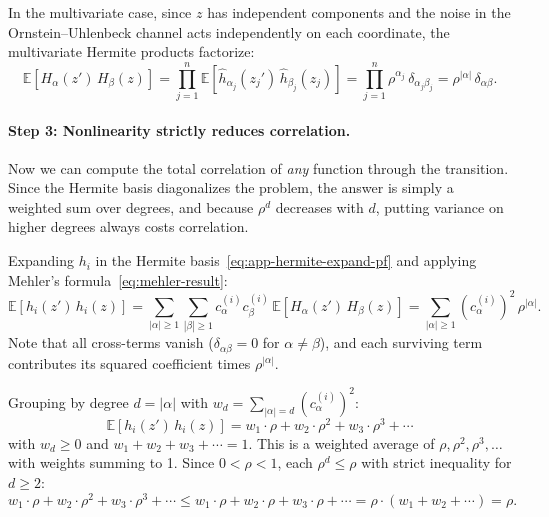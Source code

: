 In the multivariate case, since $z$ has independent components and the noise in the Ornstein--Uhlenbeck channel acts independently on each coordinate, the multivariate Hermite products factorize:
\begin{equation}\label{eq:mehler-result}
    \mathbb{E}\!\left[H_\alpha(z')\, H_\beta(z)\right] = \prod_{j=1}^n \mathbb{E}\!\left[\hat{h}_{\alpha_j}(z_j')\,\hat{h}_{\beta_j}(z_j)\right] = \prod_{j=1}^n \rho^{\alpha_j}\,\delta_{\alpha_j \beta_j} = \rho^{|\alpha|}\,\delta_{\alpha\beta}.
\end{equation}


\paragraph{Step 3: Nonlinearity strictly reduces correlation.}
Now we can compute the total correlation of \textit{any} function through the transition.
Since the Hermite basis diagonalizes the problem, the answer is simply a weighted sum over degrees, and because $\rho^d$ decreases with $d$, putting variance on higher degrees always costs correlation.

Expanding $h_i$ in the Hermite basis~\eqref{eq:app-hermite-expand-pf} and applying Mehler's formula~\eqref{eq:mehler-result}:
\begin{equation}
    \mathbb{E}\!\left[h_i(z')\, h_i(z)\right] = \sum_{|\alpha| \geq 1} \sum_{|\beta| \geq 1} c_\alpha^{(i)} c_\beta^{(i)} \,\mathbb{E}\!\left[H_\alpha(z')\, H_\beta(z)\right] = \sum_{|\alpha| \geq 1} (c_\alpha^{(i)})^2\,\rho^{|\alpha|}.
\end{equation}
Note that all cross-terms vanish ($\delta_{\alpha\beta} = 0$ for $\alpha \neq \beta$), and each surviving term contributes its squared coefficient times $\rho^{|\alpha|}$.

Grouping by degree $d = |\alpha|$ with $w_d = \sum_{|\alpha|=d} (c_\alpha^{(i)})^2$:
\begin{equation}
    \mathbb{E}\!\left[h_i(z')\, h_i(z)\right] = w_1 \cdot \rho + w_2 \cdot \rho^2 + w_3 \cdot \rho^3 + \cdots
\end{equation}
with $w_d \geq 0$ and $w_1 + w_2 + w_3 + \cdots = 1$.
This is a weighted average of $\rho, \rho^2, \rho^3, \ldots$ with weights summing to 1.
Since $0 < \rho < 1$, each $\rho^d \leq \rho$ with strict inequality for $d \geq 2$:
\begin{equation}
    w_1 \cdot \rho + w_2 \cdot \rho^2 + w_3 \cdot \rho^3 + \cdots \leq w_1 \cdot \rho + w_2 \cdot \rho + w_3 \cdot \rho + \cdots = \rho \cdot (w_1 + w_2 + \cdots) = \rho.
\end{equation}

